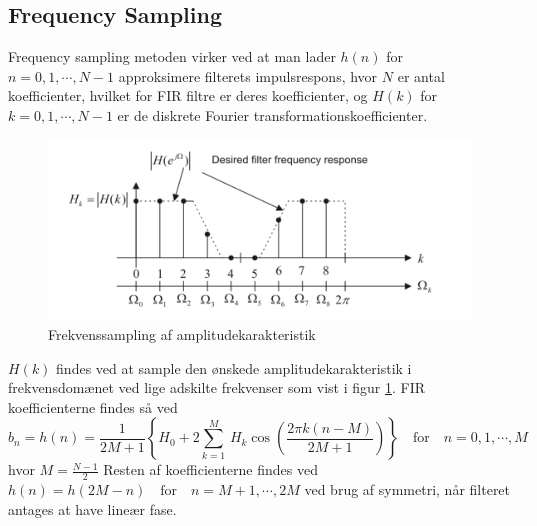 \subsection{Frequency Sampling}
Frequency sampling metoden virker ved at man lader $h(n)$ for $n = 0, 1, \cdots, N - 1$ approksimere filterets impulsrespons, hvor $N$ er antal koefficienter, hvilket for FIR filtre er deres koefficienter, og $H(k)$ for $k = 0, 1, \cdots, N - 1$ er de diskrete Fourier transformationskoefficienter.
\begin{figure}[!ht]
	\includegraphics[width=\textwidth]{billeder/frequencysampling.png}
	\caption{Frekvenssampling af amplitudekarakteristik\cite{Tan2013}}
	\label{fig:frequencysampling}
\end{figure}
$H(k)$ findes ved at sample den ønskede amplitudekarakteristik i frekvensdomænet ved lige adskilte frekvenser som vist i figur \ref{fig:frequencysampling}.
FIR koefficienterne findes så ved
\begin{equation} \label{eq:fir_koefficienter}
b_n = h(n) = \frac{1}{2M + 1} \left\{H_0 + 2\displaystyle\sum_{k = 1}^{M}\, H_k\cos\left(\frac{2\pi k (n - M)}{2M + 1} \right) \right\} \quad \mathrm{for} \quad n = 0, 1, \cdots, M
\end{equation}
hvor $M = \frac{N - 1}{2}$
Resten af koefficienterne findes ved $h(n) = h(2M - n) \quad \mathrm{for} \quad n = M + 1, \cdots, 2M$ ved brug af symmetri, når filteret antages at have lineær fase.


